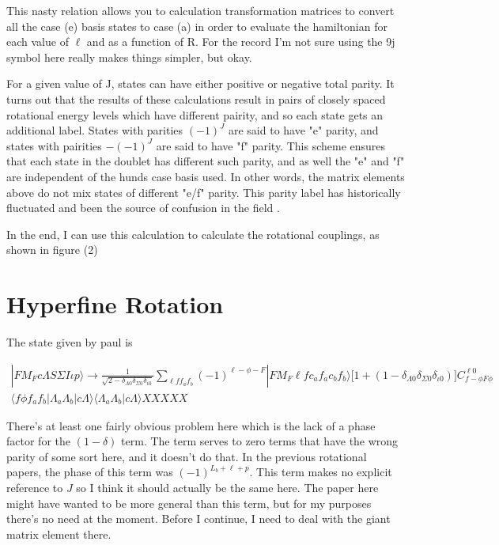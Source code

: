 \documentclass[prl, longbibliography, aps, 10pt]{revtex4-2}
\begin{document}
This nasty relation allows you to calculation transformation matrices to convert all the case (e) basis states to case (a) in order to evaluate the hamiltonian for each value of $\ell$ and as a function of R. For the record I'm not sure using the 9j symbol here really makes things simpler, but okay. 

For a given value of J, states can have either positive or negative total parity. It turns out that the results of these calculations result in pairs of closely spaced rotational energy levels which have different pairity, and so each state gets an additional label. States with parities $(-1)^J$ are said to have "e" parity, and states with pairities $-(-1)^J$ are said to have "f" parity. This scheme ensures that each state in the doublet has different such parity, and as well the "e" and "f" are independent of the hunds case basis used. In other words, the matrix elements above do not mix states of different "e/f" parity. This parity label has historically fluctuated and been the source of confusion in the field \cite{hornkohl_parity_2017,brown_labeling_1975}.

In the end, I can use this calculation to calculate the rotational couplings, as shown in figure (2)

\section{Hyperfine Rotation}

The state given by paul is

\begin{equation}
\begin{split}
|F M_F c \Lambda S \Sigma I \iota p\rangle \rightarrow \frac{1}{\sqrt{2-\delta_{\Lambda 0}\delta_{\Sigma 0} \delta_{\iota 0}}} \sum_{\ell f f_a f_b}(-1)^{\ell-\phi-F}|F M_F \ell f c_a f_a c_b f_b\rangle\Big[1+(1-\delta_{\Lambda 0}\delta_{\Sigma 0} \delta_{\iota 0})\Big]
C_{f -\phi F \phi}^{\ell 0} \\
\langle f \phi f_a f_b | \Lambda_a \Lambda_b | c \Lambda \rangle \langle \Lambda_a \Lambda_b| c \Lambda \rangle XXXXX
\end{split}
\end{equation}

There's at least one fairly obvious problem here which is the lack of a phase factor for the $(1-\delta)$ term. The term serves to zero terms that have the wrong parity of some sort here, and it doesn't do that. In the previous rotational papers, the phase of this term was $(-1)^{L_b+\ell +p}$. This term makes no explicit reference to $J$ so I think it should actually be the same here. The paper here might have wanted to be more general than this term, but for my purposes there's no need at the moment. Before I continue, I need to deal with the giant matrix element there. 
\end{document}
